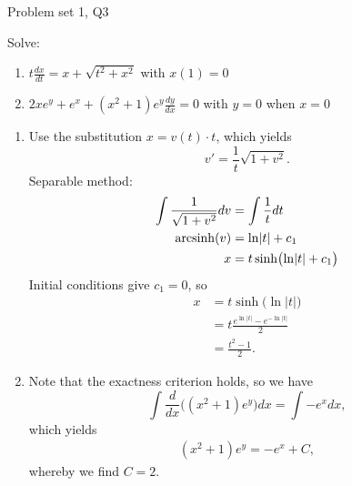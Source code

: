 \begin{problem}{Problem set 1, Q3}{}


    Solve:
    \begin{enumerate}
        \item $t \frac{dx}{dt} = x + \sqrt{t^2 + x^2}$ with $x(1) = 0$
        \item $2xe^y + e^x + (x^2 + 1) e^y \frac{dy}{dx} = 0$ with $y = 0$ when $x = 0$
    \end{enumerate}

    \tcblower

    \begin{enumerate}
        \item Use the substitution $x = v(t) \cdot t$, which yields
            $$ v' = \frac{1}{t} \sqrt{1 + v^2} . $$
        Separable method:
            \begin{align*}
                \int \frac{1}{\sqrt{1 + v^2}} dv 
                    &= \int \frac{1}{t} dt \\
                \operatorname{arcsinh}(v) &= \ln \lvert t \rvert + c_1 \\
                x &= t \sinh \bigl( \ln \lvert t \rvert + c_1 \bigr)
            \end{align*}
        Initial conditions give $c_1 = 0$, so
            \begin{align*}
                x &= t \sinh \bigl( \ln \lvert t \rvert \bigr) \\
                &= t \frac{e^{\ln \lvert t \rvert}
                    - e^{-\ln \lvert t \rvert}}{2} \\
                &= \frac{t^2 - 1}{2} .
            \end{align*}
        \item {} Note that the exactness criterion holds, so we have
            $$ \int \frac{d}{dx} \bigl( 
                    (x^2 + 1)e^y \bigr) dx 
                    = \int -e^x dx , $$
        which yields
            \begin{align*}
                (x^2 + 1) e^y = -e^x + C ,
            \end{align*}
        whereby we find $C = 2$.
    \end{enumerate}

\end{problem}


